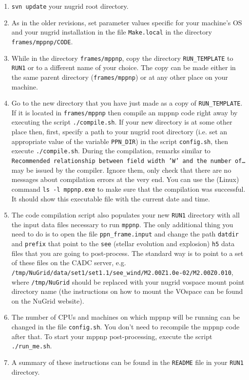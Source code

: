 \begin{enumerate}
\item 
\texttt{svn update} your nugrid root directory. 
\item
As in the older revisions, set parameter values specific for your machine's OS
and your nugrid installation in the file \texttt{Make.local} in the directory
\texttt{frames/mppnp/CODE}. 
\item
While in the directory \texttt{frames/mppnp},
copy the directory \texttt{RUN\_TEMPLATE} to \texttt{RUN1}
or to a different name of your choice. The copy can be made either
in the same parent directory (\texttt{frames/mppnp}) or at any other place
on your machine.
\item
Go to the new directory that you have just made as a copy of \texttt{RUN\_TEMPLATE}.
If it is located in \texttt{frames/mppnp} then compile an mppnp code right away
by executing the script \texttt{./compile.sh}. If your new directory is
at some other place then, first, specify a path to your nugrid root directory
(i.e. set an appropriate value of the variable \texttt{PPN\_DIR}) in the script
\texttt{config.sh}, then execute \texttt{./compile.sh}.
During the compilation, remarks similar to \texttt{Recommended relationship between 
field width 'W' and the number of\ldots }
may be issued by the compiler. Ignore them, only check that there are no messages about
compilation errors at the very end. You can use the (Linux) command \texttt{ls -l mppnp.exe} 
to make sure that the compilation was successful. It should show
this executable file with the current date and time.
\item
The code compilation script also populates your new \texttt{RUN1} directory with
all the input data files necessary to run \texttt{mppnp}. The only additional thing
you need to do is to open the file \texttt{ppn\_frame.input} and change the path
\texttt{datdir} and \texttt{prefix} that point to the \texttt{see} (stellar evolution and explosion)
\texttt{h5} data files that you are going to post-process. The standard way is to point
to a set of these files on the CADC server, e.g.
\texttt{/tmp/NuGrid/data/set1/set1.1/see\_wind/M2.00Z1.0e-02/M2.00Z0.010},
where \texttt{/tmp/NuGrid} should be replaced with your nugrid vospace mount point
directory name (the instructions on how to mount the VOspace can be found on
the NuGrid website).
\item
The number of CPUs and machines on which mppnp will be running can be changed
in the file \texttt{config.sh}. You don't need to recompile the mppnp code after that.
To start your mppnp post-processing, execute the script \texttt{./run\_me.sh}.
\item
A summary of these instructions can be found in the \texttt{README} file in
your \texttt{RUN1} directory.
\end{enumerate}

